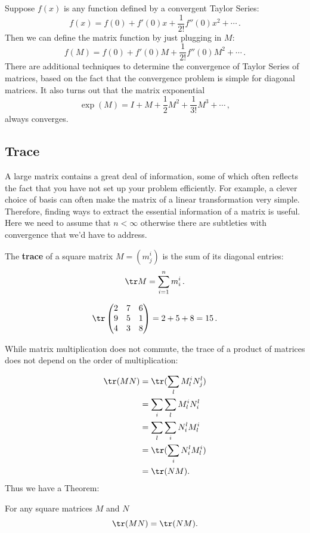 Suppose $f(x)$ is any function defined by a convergent Taylor Series:
\[
f(x) = f(0) + f'(0)x + \frac{1}{2!}f''(0)x^2 + \cdots\, .
\]
Then we can define the matrix function by just plugging in $M$:
\[
f(M) = f(0) + f'(0)M + \frac{1}{2!}f''(0)M^2 + \cdots\, .
\]
There are additional techniques to determine the convergence of Taylor Series of matrices, based on the fact that the convergence problem is simple for diagonal matrices.  It also turns out that the matrix exponential
\[\exp (M) = I + M + \frac{1}{2}M^2 + \frac{1}{3!}M^3 + \cdots\, ,\] always converges.



\subsection{Trace}

A large matrix contains a great deal of information, some of which often reflects the fact that you have not set up your problem efficiently. For example, a clever choice of basis can often make the matrix of a linear transformation very simple. Therefore, finding ways to extract the essential information of a matrix is useful. Here we need to assume that $n < \infty$ otherwise there are subtleties with convergence that we'd have to address.

\begin{definition}
The \hypertarget{TRACE}{{\bfseries trace}} of a square matrix $M=(m_j^i)$ is the sum of its diagonal entries:
\[
\tr M = \sum_{i=1}^{n}m_i^i\, .
\]
\end{definition}

\begin{example}
\[
\tr \begin{pmatrix}
2 & 7 & 6\\
9 & 5 & 1\\
4 & 3 & 8\\
\end{pmatrix} = 2+5+8 = 15\, .
\]
\end{example}
While matrix multiplication does not commute, the trace of a product of matrices does not depend on the order of multiplication:

\begin{align*}
\tr(MN) & = \tr( \sum_l M_l^i N_j^l ) \\
& = \sum_i \sum_l M_l^i N_i^l \\
& = \sum_l \sum_i N_i^l M_l^i \\
& = \tr( \sum_i N_i^l M_l^i ) \\
& = \tr( NM ).
\end{align*}
Thus we have a Theorem:
\begin{theorem} For any square matrices $M$ and $N$ \[\tr(MN)=\tr(NM).\]
\end{theorem}

